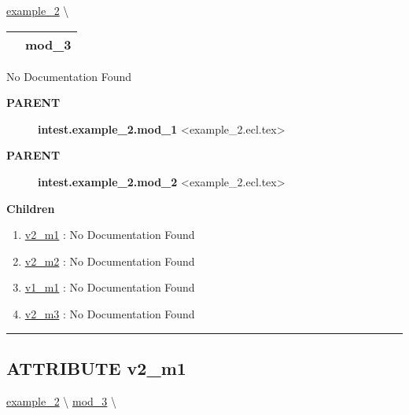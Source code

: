 \hypertarget{ecldoc:intest.example_2.mod_3}{}
\hspace{0pt} \hyperlink{ecldoc:intest.example_2}{example_2} \textbackslash 

{\renewcommand{\arraystretch}{1.5}
\begin{tabularx}{\textwidth}{|>{\raggedright\arraybackslash}l|X|}
\hline
\hspace{0pt}\mytexttt{\color{red} } & \textbf{mod\_3} \\
\hline
\end{tabularx}
}

\par





No Documentation Found










\par
\begin{description}
\item [\colorbox{tagtype}{\color{white} \textbf{\textsf{PARENT}}}] \textbf{intest.example\_2.mod\_1} <example\_2.ecl.tex>
\item [\colorbox{tagtype}{\color{white} \textbf{\textsf{PARENT}}}] \textbf{intest.example\_2.mod\_2} <example\_2.ecl.tex>
\end{description}


\textbf{Children}
\begin{enumerate}
\item \hyperlink{ecldoc:intest.example_2.mod_1.v2_m1}{v2\_m1}
: No Documentation Found
\item \hyperlink{ecldoc:intest.example_2.mod_2.v2_m2}{v2\_m2}
: No Documentation Found
\item \hyperlink{ecldoc:intest.example_2.mod_3.v1_m1}{v1\_m1}
: No Documentation Found
\item \hyperlink{ecldoc:intest.example_2.mod_3.v2_m3}{v2\_m3}
: No Documentation Found
\end{enumerate}

\rule{\linewidth}{0.5pt}

\subsection*{\textsf{\colorbox{headtoc}{\color{white} ATTRIBUTE}
v2\_m1}}

\hypertarget{ecldoc:intest.example_2.mod_1.v2_m1}{}
\hspace{0pt} \hyperlink{ecldoc:intest.example_2}{example_2} \textbackslash 
\hspace{0pt} \hyperlink{ecldoc:intest.example_2.mod_3}{mod_3} \textbackslash 

